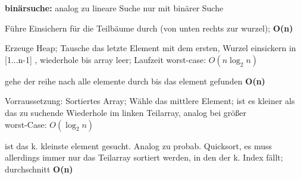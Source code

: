 \textbf{binärsuche:} analog zu lineare Suche nur mit binärer Suche 


Führe Einsichern für die Teilbäume durch (von unten rechts zur wurzel); \textbf{O(n)}

Erzeuge Heap; 
Tausche das letzte Element mit dem ersten, Wurzel einsickern in [1...n-1] , wiederhole bis array leer; 
Laufzeit worst-case: $O(n\log_2n)$

gehe der reihe nach alle elemente durch bis das element gefunden \textbf{O(n)}

Vorraussetzung: Sortiertes Array;
Wähle das mittlere Element; ist es kleiner als das zu suchende Wiederhole im linken Teilarray, analog bei größer\\
worst-Case: $O(\log_2n)$

ist das k. kleinste element gesucht. Analog zu probab. Quicksort, es muss allerdings immer nur das Teilarray sortiert werden, in den der k. Index fällt; durchschnitt \textbf{O(n)}